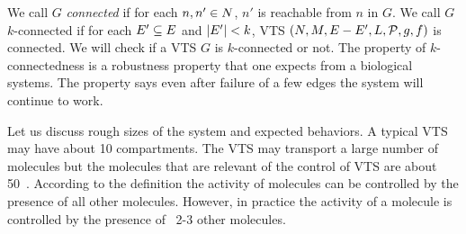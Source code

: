 %
We call $G$ {\em connected} if for each $n,n' \in N$,
$n'$ is reachable from $n$ in $G$.
%
We call $G$ $k$-connected if for each $E' \subseteq E$ and
$|E'| < k$, VTS
$(N,M,E-E',L,\mathcal{P},g,f)$ is connected.
%
We will check if a VTS $G$ is $k$-connected or not.
%
The property of $k$-connectedness is a robustness property that one
expects from a biological systems.
%
The property says even after failure of a few edges the system will continue to work.


%

Let us discuss rough sizes of the system and expected behaviors.
%
A typical VTS may have about 10 compartments.
%
The VTS may transport a large number of molecules but the molecules that
are relevant of the control of VTS are about 50~\cite{doWeKnowThis}.
%
According to the definition the activity of molecules can be controlled by
the presence of all other molecules.
%
However, in practice the activity of a molecule is controlled by
the presence of ~2-3 other molecules.

